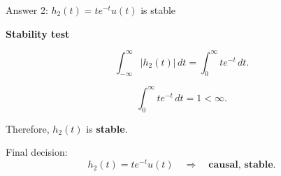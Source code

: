 \documentclass[aspectratio=169,11pt]{beamer}
\newcommand{\CardTitleSize}{\large}
\newcommand{\CardTitle}[1]{%
  \vspace{0.15cm}
  {\CardTitleSize\bfseries #1}\par
}
\begin{document}
\begin{frame}{Answer 2: \(h_2(t)=t e^{-t}u(t)\) is stable}

\begin{center}
\begin{GreenCard}[
  width=0.86\textwidth,
  halign=center,
  top=12pt,
  bottom=12pt
]
\CardTitle{Stability test}

\vspace{0.08cm}

\[
\int_{-\infty}^{\infty}|h_2(t)|\,dt
=
\int_{0}^{\infty}t e^{-t}\,dt.
\]

\vspace{0.08cm}

\[
\int_{0}^{\infty}t e^{-t}\,dt
=
1
<\infty.
\]

\vspace{0.12cm}

\begin{GreenBox}[
  calloutshadedgreen,
  halign=center,
  fontupper=\Large
]{}
Therefore, \(h_2(t)\) is \textbf{stable}.
\end{GreenBox}

\vspace{0.08cm}

\begin{BlueBox}[
  calloutshadedblue,
  halign=center,
  fontupper=\large
]{}
Final decision:
\[
h_2(t)=t e^{-t}u(t)
\quad\Rightarrow\quad
\textbf{causal, stable}.
\]
\end{BlueBox}

\end{GreenCard}
\end{center}

\end{frame}
\end{document}
